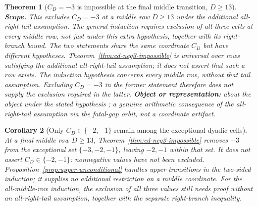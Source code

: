 \documentclass[11pt]{article}
\theoremstyle{plain}
\newtheorem{thm}{Theorem}[section]
\newtheorem{cor}[thm]{Corollary}
\theoremstyle{definition}
\theoremstyle{remark}
\begin{document}
\begin{thm}[$C_D=-3$ is impossible at the final middle transition, $D\ge 13$]
\textbf{Scope.} This excludes $C_D=-3$ at a middle row $D\ge13$
under the additional all-right-tail assumption.  The general induction
requires exclusion of all three cells at every middle row, not just
under this extra hypothesis, together with its right-branch bound. The two statements share the same coordinate $C_D$
but have different hypotheses.  Theorem~\ref{thm:cd-neg3-impossible}
is universal over rows satisfying the additional all-right-tail
assumption; it does not assert that such a row exists.  The induction
hypothesis concerns every middle row, without that tail assumption.
Excluding $C_D=-3$ in the former statement therefore does not supply
the exclusion required in the latter.
\textbf{Object or representation:} about the \emph{object}
under the stated hypothesis ;  a genuine arithmetic consequence of the all-right-tail assumption
via the fatal-gap orbit, not a coordinate artifact.
\end{thm}

\begin{cor}[Only $C_D\in\{-2,-1\}$ remain among the exceptional dyadic cells]
\label{cor:cd-remaining}
At a final middle row $D\ge13$, Theorem~\ref{thm:cd-neg3-impossible}
removes $-3$ from the exceptional set $\{-3,-2,-1\}$, leaving
$-2,-1$ \emph{within that set}.  It does not assert
$C_D\in\{-2,-1\}$: nonnegative values have not been excluded.
Proposition~\ref{prop:upper-unconditional} handles upper transitions
in the two-sided induction; it supplies no additional restriction on
a middle coordinate.  For the all-middle-row induction, the exclusion
of all three values still needs proof without an all-right-tail
assumption, together with the separate right-branch inequality.
\end{cor}
\end{document}
